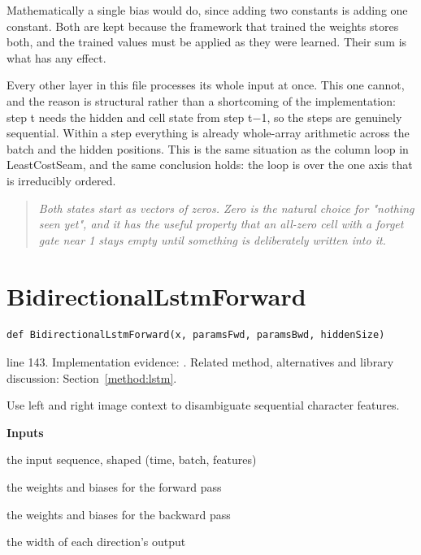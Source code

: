Mathematically a single bias would do, since adding two constants is adding one constant. Both are kept because the framework that trained the weights stores both, and the trained values must be applied as they were learned. Their sum is what has any effect.


Every other layer in this file processes its whole input at once. This one cannot, and the reason is structural rather than a shortcoming of the implementation: step t needs the hidden and cell state from step t$-$1, so the steps are genuinely sequential. Within a step everything is already whole-array arithmetic across the batch and the hidden positions. This is the same situation as the column loop in LeastCostSeam, and the same conclusion holds: the loop is over the one axis that is irreducibly ordered.


\begin{quote}\small\itshape Both states start as vectors of zeros. Zero is the natural choice for "nothing seen yet", and it has the useful property that an all-zero cell with a forget gate near 1 stays empty until something is deliberately written into it.\end{quote}


\section{BidirectionalLstmForward}\label{fn:recognise:BidirectionalLstmForward}
\begin{lstlisting}[style=sig]
def BidirectionalLstmForward(x, paramsFwd, paramsBwd, hiddenSize)
\end{lstlisting}
 line 143. Implementation evidence: \cite{code2026}. Related method, alternatives and library discussion: Section~\ref{method:lstm}.


Use left and right image context to disambiguate sequential character features.




\noindent\textbf{Inputs}
\begin{description}[leftmargin=2.2em,style=nextline,font=\normalfont\ttfamily]\setlength\itemsep{1pt}
  \item[{x}] \normalfont the input sequence, shaped (time, batch, features)
  \item[{paramsFwd}] \normalfont the weights and biases for the forward pass
  \item[{paramsBwd}] \normalfont the weights and biases for the backward pass
  \item[{hiddenSize}] \normalfont the width of each direction's output
\end{description}

